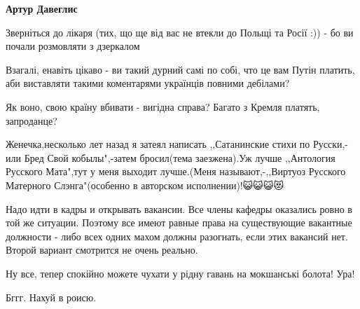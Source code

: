 \begin{itemize}
\begin{itemize}
\textbf{Артур Давеглис} 

Зверніться до лікаря (тих, що ще від вас не втекли до Польщі та Росії :)) - бо
ви почали розмовляти з дзеркалом \Smiley[1.0][yellow]

Взагалі, енавіть цікаво - ви такий дурний самі по собі, что це вам Путін
платить, аби виставляти такими коментарями українців повними дебілами? \Smiley[1.0][yellow]

Як воно, свою країну вбивати - вигідна справа? Багато з Кремля платять,
запроданце?
\end{itemize}

 

Женечка,несколько лет назад я затеял написать ,,Сатанинские стихи по
Русски,-или Бред Свой кобылы",-затем бросил(тема заезжена).Уж лучше ,,Антология
Русского Мата",тут у меня выходит лучше.(Меня называют,-,,Виртуоз Русского
Матерного Слэнга"(особенно в авторском исполнении)!😺😺😺😻


 

Надо идти в кадры и открывать вакансии. Все члены кафедры оказались ровно в той
же ситуации. Поэтому все имеют равные права на существующие вакантные должности
- либо всех одних махом должны разогнать, если этих вакансий нет. Второй
вариант смотрится не очень реально.


 
Ну все, тепер спокійно можете чухати у рідну гавань на мокшанські болота! Ура!

 
Бггг. Нахуй в роисю.

\begin{itemize}
 

\end{itemize}
\end{itemize}
